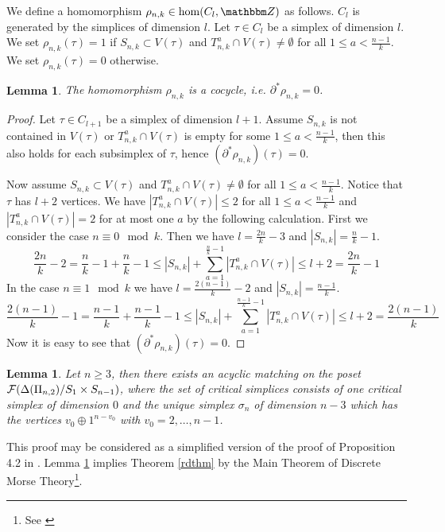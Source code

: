 \documentclass{elsarticle}
\newtheorem{lem}[df]{Lemma}
\def\Z{\mathbbm Z}
\begin{document}
We define a homomorphism $\rho_{n,k}\in\hom(C_l,\Z)$ as follows. $C_l$ is generated by the simplices of dimension $l$. Let $\tau\in C_l$ be a simplex of dimension $l$. We set $\rho_{n,k}(\tau)=1$ if $S_{n,k}\subset V(\tau)$ and $T_{n,k}^a\cap V(\tau)\not=\emptyset$ for all $1\leq a<\frac {n-1}k$. We set $\rho_{n,k}(\tau)=0$ otherwise.
\begin{lem}
\label{cocycle}
The homomorphism $\rho_{n,k}$ is a cocycle, i.e. $\partial^*\rho_{n,k}=0$.
\end{lem}
\begin{proof}
Let $\tau\in C_{l+1}$ be a simplex of dimension $l+1$. Assume $S_{n,k}$ is not contained in $V(\tau)$ or  $T_{n,k}^a\cap V(\tau)$ is empty for some $1\leq a<\frac {n-1}k$, then this also holds for each subsimplex of $\tau$, hence $(\partial^*\rho_{n,k})(\tau)=0$.

Now assume $S_{n,k}\subset V(\tau)$ and $T_{n,k}^a\cap V(\tau)\not=\emptyset$ for all $1\leq a<\frac {n-1}k$. Notice that $\tau$ has $l+2$ vertices. We have $|T_{n,k}^a\cap V(\tau)|\leq 2$ for all $1\leq a<\frac {n-1}k$ and $|T_{n,k}^a\cap V(\tau)|=2$ for at most one $a$ by the following calculation. First we consider the case $n\equiv 0\mod k$. Then we have $l=\frac{2n}k-3$ and $|S_{n,k}|=\frac nk-1$.
\[
\frac{2n}k-2=\frac nk-1+\frac nk-1\leq |S_{n,k}|+\sum_{a=1}^{\frac nk-1}|T_{n,k}^a\cap V(\tau)|\leq l+2=\frac{2n}k-1
\]
In the case $n\equiv 1\mod k$ we have $l=\frac{2(n-1)}k-2$ and $|S_{n,k}|=\frac {n-1}k$.
\[
\frac{2(n-1)}k-1=\frac {n-1}k+\frac {n-1}k-1\leq |S_{n,k}|+\sum_{a=1}^{\frac {n-1}k-1}|T_{n,k}^a\cap V(\tau)|\leq l+2=\frac{2(n-1)}k
\]
Now it is easy to see that $(\partial^*\rho_{n,k})(\tau)=0$.
\end{proof}
\begin{lem}
\label{nicematching}
Let $n\geq3$, then there exists an acyclic matching on the poset ${\cal F}(\Delta(\Pi_{n,2})/S_1\times S_{n-1})$, where the set of critical simplices consists of one critical simplex of dimension $0$ and the unique simplex $\sigma_n$ of dimension $n-3$ which has the vertices $v_0\oplus 1^{n-v_0}$ with $v_0=2,\dots,n-1$.
\end{lem}
This proof may be considered as a simplified version of the proof of Proposition 4.2 in \cite{donau}. Lemma \ref{nicematching} implies Theorem \ref{rdthm} by the Main Theorem of Discrete Morse Theory\footnote{See \cite[Chapter 11]{buch}}.
\end{document}
